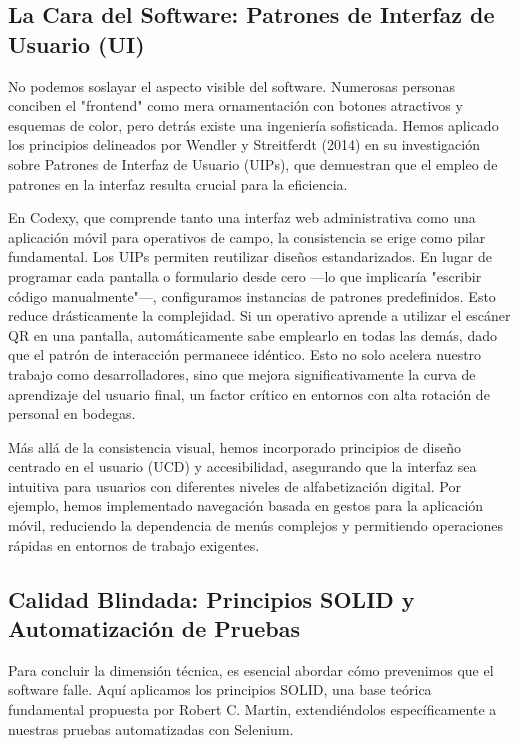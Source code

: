 \subsection{La Cara del Software: Patrones de Interfaz de Usuario (UI)}

No podemos soslayar el aspecto visible del software. Numerosas personas conciben el "frontend" como mera ornamentación con botones atractivos y esquemas de color, pero detrás existe una ingeniería sofisticada. Hemos aplicado los principios delineados por Wendler y Streitferdt (2014) en su investigación sobre Patrones de Interfaz de Usuario (UIPs), que demuestran que el empleo de patrones en la interfaz resulta crucial para la eficiencia.

En Codexy, que comprende tanto una interfaz web administrativa como una aplicación móvil para operativos de campo, la consistencia se erige como pilar fundamental. Los UIPs permiten reutilizar diseños estandarizados. En lugar de programar cada pantalla o formulario desde cero —lo que implicaría "escribir código manualmente"—, configuramos instancias de patrones predefinidos. Esto reduce drásticamente la complejidad. Si un operativo aprende a utilizar el escáner QR en una pantalla, automáticamente sabe emplearlo en todas las demás, dado que el patrón de interacción permanece idéntico. Esto no solo acelera nuestro trabajo como desarrolladores, sino que mejora significativamente la curva de aprendizaje del usuario final, un factor crítico en entornos con alta rotación de personal en bodegas.

Más allá de la consistencia visual, hemos incorporado principios de diseño centrado en el usuario (UCD) y accesibilidad, asegurando que la interfaz sea intuitiva para usuarios con diferentes niveles de alfabetización digital. Por ejemplo, hemos implementado navegación basada en gestos para la aplicación móvil, reduciendo la dependencia de menús complejos y permitiendo operaciones rápidas en entornos de trabajo exigentes.

\subsection{Calidad Blindada: Principios SOLID y Automatización de Pruebas}

Para concluir la dimensión técnica, es esencial abordar cómo prevenimos que el software falle. Aquí aplicamos los principios SOLID, una base teórica fundamental propuesta por Robert C. Martin, extendiéndolos específicamente a nuestras pruebas automatizadas con Selenium.

